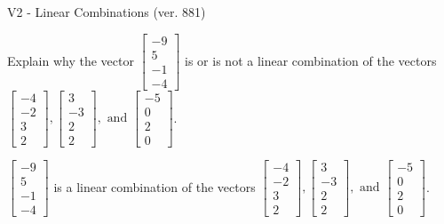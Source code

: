 \begin{exercise}
  \begin{exerciseTitle}V2 - Linear Combinations (ver. 881)\end{exerciseTitle}
  \begin{exerciseStatement}
    Explain why the vector \(\left[\begin{array}{c}
-9 \\
5 \\
-1 \\
-4
\end{array}\right]\)  is or is not a linear 
	combination of the vectors \(\left[\begin{array}{c}
-4 \\
-2 \\
3 \\
2
\end{array}\right] , \left[\begin{array}{c}
3 \\
-3 \\
2 \\
2
\end{array}\right] , \text{ and } \left[\begin{array}{c}
-5 \\
0 \\
2 \\
0
\end{array}\right]\).
	


  \end{exerciseStatement}
  \begin{exerciseAnswer}
   \(\left[\begin{array}{c}
-9 \\
5 \\
-1 \\
-4
\end{array}\right]\) 
  	 is  
	a linear combination of the vectors \(\left[\begin{array}{c}
-4 \\
-2 \\
3 \\
2
\end{array}\right] , \left[\begin{array}{c}
3 \\
-3 \\
2 \\
2
\end{array}\right] , \text{ and } \left[\begin{array}{c}
-5 \\
0 \\
2 \\
0
\end{array}\right]\).

	
  


  \end{exerciseAnswer}
\end{exercise}